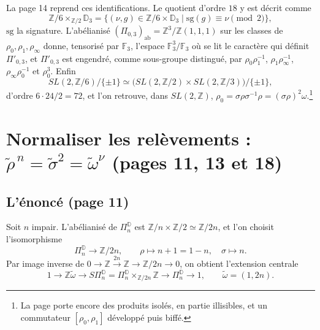 \documentclass[11pt,a4paper]{article}
\begin{document}
La page 14 reprend ces identifications. Le quotient d'ordre $18$ y est décrit
comme
\[
\mathbb{Z}/6 \times_{\mathbb{Z}/2} \mathbb{D}_3 = \{ (\nu, g) \in \mathbb{Z}/6
\times \mathbb{D}_3 \mid \mathrm{sg}(g) \equiv \nu \pmod 2 \},
\]
$\mathrm{sg}$ la signature. L'abélianisé $(\Pi_{0,3})_{\mathrm{ab}} =
\mathbb{Z}^3/\mathbb{Z}(1,1,1)$ sur les classes de $\rho_0, \rho_1, \rho_\infty$
donne, tensorisé par $\mathbb{F}_3$, l'espace $\mathbb{F}_3^3/\mathbb{F}_3$ où se
lit le caractère qui définit $\Pi'_{0,3}$, et $\Pi'_{0,3}$ est engendré, comme
sous-groupe distingué, par $\rho_0\rho_1^{-1}$, $\rho_1\rho_\infty^{-1}$,
$\rho_\infty\rho_0^{-1}$ et $\rho_0^3$. Enfin
\[
SL(2, \mathbb{Z}/6)/\{\pm 1\} \simeq \bigl(SL(2, \mathbb{Z}/2) \times
SL(2, \mathbb{Z}/3)\bigr)/\{\pm 1\} ,
\]
d'ordre $6 \cdot 24/2 = 72$, et l'on retrouve, dans $SL(2, \mathbb{Z})$,
$\rho_0 = \sigma\rho\sigma^{-1}\rho = (\sigma\rho)^2\omega$.\footnote{La page porte
encore des produits isolés, en partie illisibles, et un commutateur
$[\rho_0, \rho_1]$ développé puis biffé.}

\section*{Normaliser les relèvements : $\tilde\rho^{\,n} = \tilde\sigma^2 = \tilde\omega^{\nu}$ (pages 11, 13 et 18)}

\subsection*{L'énoncé (page 11)}

Soit $n$ impair. L'abélianisé de $\Pi^{\mathbb{D}}_n$ est $\mathbb{Z}/n \times
\mathbb{Z}/2 \simeq \mathbb{Z}/2n$, et l'on choisit l'isomorphisme
\[
\Pi^{\mathbb{D}}_n \longrightarrow \mathbb{Z}/2n, \qquad
\rho \longmapsto n + 1 = 1 - n, \quad \sigma \longmapsto n .
\]
Par image inverse de $0 \to \mathbb{Z} \xrightarrow{2n} \mathbb{Z} \to \mathbb{Z}/2n
\to 0$, on obtient l'extension centrale
\[
1 \to \mathbb{Z}\tilde\omega \to S\Pi^{\mathbb{D}}_n = \Pi^{\mathbb{D}}_n
\times_{\mathbb{Z}/2n} \mathbb{Z} \to \Pi^{\mathbb{D}}_n \to 1, \qquad
\tilde\omega = (1, 2n) .
\]
\end{document}
